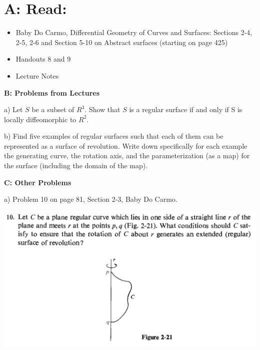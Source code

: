 \documentclass[10pt,letterpaper]{hmcpset}
\begin{document}
\section*{A: Read: } 

\begin{itemize}
\item{Baby Do Carmo, Differential Geometry
    of Curves and Surfaces:  
Sections 2-4, 2-5, 2-6 and Section 5-10 on Abstract surfaces (starting 
on page 425)} 
\item{Handouts 8 and 9}
\item{Lecture Notes}
\end{itemize}

\textbf{B: Problems from Lectures}


\begin{problem}
a) Let $S$ be a subset of $R^3$.  Show that $S$ is a
regular surface if and only if S is locally diffeomorphic 
to $R^2$.
\end{problem}

\newpage
\begin{problem}
b) Find five examples of regular surfaces such that each of 
them can be represented as a surface of revolution.  Write down
specifically for each example the generating curve, the rotation 
axis, and the parameterization (as a map) for the surface (including
the domain of the map).
\end{problem}

\newpage
\textbf{C: Other Problems}

\begin{problem}
a) Problem 10 on page 81, Section 2-3, Baby Do Carmo.

\includegraphics[scale=0.7]{Ca.png}
\end{problem}
\end{document}
